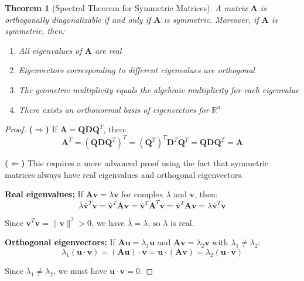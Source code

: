 \documentclass[12pt]{article}
\numberwithin{equation}{section}
\newcommand{\vect}[1]{\boldsymbol{#1}}   %
\newcommand{\mat}[1]{\mathbf{#1}}        %
\theoremstyle{plain}
\newtheorem{theorem}{Theorem}[section]
\theoremstyle{definition}
\theoremstyle{remark}
\begin{document}
\begin{theorem}[Spectral Theorem for Symmetric Matrices]
A matrix $\mat{A}$ is orthogonally diagonalizable if and only if $\mat{A}$ is symmetric. Moreover, if $\mat{A}$ is symmetric, then:
\begin{enumerate}
\item All eigenvalues of $\mat{A}$ are real
\item Eigenvectors corresponding to different eigenvalues are orthogonal
\item The geometric multiplicity equals the algebraic multiplicity for each eigenvalue
\item There exists an orthonormal basis of eigenvectors for $\mathbb{R}^n$
\end{enumerate}
\end{theorem}

\begin{proof}
\textbf{($\Rightarrow$)} If $\mat{A} = \mat{Q}\mat{D}\mat{Q}^T$, then:
$$\mat{A}^T = (\mat{Q}\mat{D}\mat{Q}^T)^T = (\mat{Q}^T)^T\mat{D}^T\mat{Q}^T = \mat{Q}\mat{D}\mat{Q}^T = \mat{A}$$

\textbf{($\Leftarrow$)} This requires a more advanced proof using the fact that symmetric matrices always have real eigenvalues and orthogonal eigenvectors.

\textbf{Real eigenvalues:} If $\mat{A}\vect{v} = \lambda\vect{v}$ for complex $\lambda$ and $\vect{v}$, then:
$$\overline{\lambda}\overline{\vect{v}}^T\vect{v} = \overline{\vect{v}}^T\overline{\mat{A}}\vect{v} = \overline{\vect{v}}^T\mat{A}^T\vect{v} = \overline{\vect{v}}^T\mat{A}\vect{v} = \lambda\overline{\vect{v}}^T\vect{v}$$

Since $\overline{\vect{v}}^T\vect{v} = \|\vect{v}\|^2 > 0$, we have $\overline{\lambda} = \lambda$, so $\lambda$ is real.

\textbf{Orthogonal eigenvectors:} If $\mat{A}\vect{u} = \lambda_1\vect{u}$ and $\mat{A}\vect{v} = \lambda_2\vect{v}$ with $\lambda_1 \neq \lambda_2$:
$$\lambda_1(\vect{u} \cdot \vect{v}) = (\mat{A}\vect{u}) \cdot \vect{v} = \vect{u} \cdot (\mat{A}\vect{v}) = \lambda_2(\vect{u} \cdot \vect{v})$$

Since $\lambda_1 \neq \lambda_2$, we must have $\vect{u} \cdot \vect{v} = 0$.
\end{proof}
\end{document}
